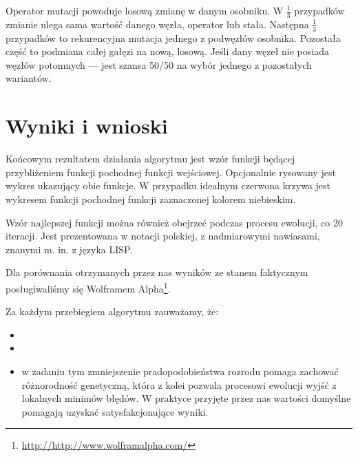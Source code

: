 \documentclass{classrep2}
\begin{document}
Operator mutacji powoduje losową zmianę w danym osobniku. W $\frac{1}{3}$ przypadków zmianie ulega sama wartość danego węzła, operator lub stała. Następna $\frac{1}{3}$ przypadków to rekurencyjna mutacja jednego z podwęzłów osobnika. Pozostała część to podmiana całej gałęzi na nową, losową. Jeśli dany węzeł nie posiada węzłów potomnych --- jest szansa 50/50 na wybór jednego z pozostałych wariantów.

\section {Wyniki i wnioski}
Końcowym rezultatem działania algorytmu jest wzór funkcji będącej przybliżeniem funkcji pochodnej funkcji wejściowej. Opcjonalnie rysowany jest wykres ukazujący obie funkcje. W przypadku idealnym czerwona krzywa jest wykresem funkcji pochodnej funkcji zaznaczonej kolorem niebieskim.

Wzór najlepszej funkcji można również obejrzeć podczas procesu ewolucji, co 20 iteracji. Jest prezentowana w notacji polskiej, z nadmiarowymi nawiasami, znanymi m. in. z języka LISP.

Dla porównania otrzymanych przez nas wyników ze stanem faktycznym posługiwaliśmy się Wolframem Alpha\footnote{\url{http://http://www.wolframalpha.com/}}.

Za każdym przebiegiem algorytmu zauważamy, że:
\begin{itemize}
  \item 
  \item 
  \item w zadaniu tym zmniejszenie pradopodobieństwa rozrodu pomaga zachować różnorodność genetyczną, która z kolei pozwala procesowi ewolucji wyjść z lokalnych minimów błędów. W praktyce przyjęte przez nas wartości domyślne pomagają uzyskać satysfakcjonujące wyniki.
\end{itemize}
\end{document}
